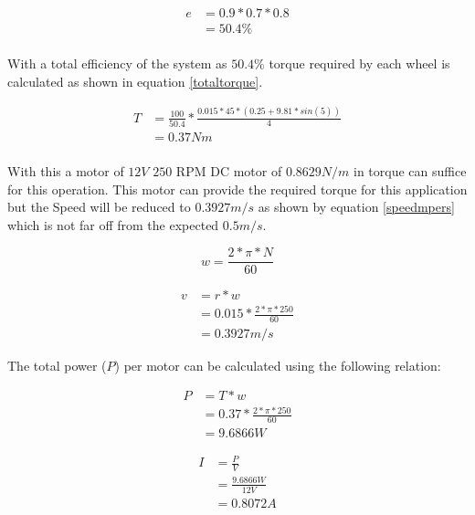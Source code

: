 \begin{equation} \label{totalefficiency}
\begin{split}
e & = 0.9 * 0.7 * 0.8 \\
& = 50.4\% \\
\end{split}
\end{equation}

With a total efficiency of the system as $50.4\%$ torque required by each wheel is calculated as shown in equation \ref{totaltorque}.

\begin{equation} \label{totaltorque}
\begin{split}
T & = \frac{100}{50.4} * \frac{0.015 * 45  *( 0.25 + 9.81 * sin(5))}{4} \\
& = 0.37 Nm \\
\end{split}
\end{equation}

With this a motor of $12V$ $250$ \ac{RPM} \ac{DC} motor of $0.8629 N/m$ in torque can suffice for this operation. This motor can provide the required torque for this application but the Speed will be reduced to $0.3927 m/s$ as shown by equation \ref{speedmpers} which is not far off from the expected $0.5 m/s$.

\begin{equation} \label{speedRadians}
w = \frac{2 * \pi * N}{60}
\end{equation}

\begin{equation} \label{speedmpers}
\begin{split}
v & = r * w\\
& = 0.015 * \frac{2 * \pi * 250}{60} \\
& = 0.3927 m/s 
\end{split}
\end{equation}

The total power ($P$) per motor can be calculated using the following relation:

\begin{equation} \label{totalefficiency}
\begin{split}
P & = T * w\\
& = 0.37 * \frac{2 * \pi * 250}{60} \\
& = 9.6866W 
\end{split}
\end{equation}

\begin{equation} \label{totalefficiency}
\begin{split}
I & = \frac{P}{V}\\
& = \frac{9.6866 W}{12 V} \\
& = 0.8072 A
\end{split}
\end{equation}


